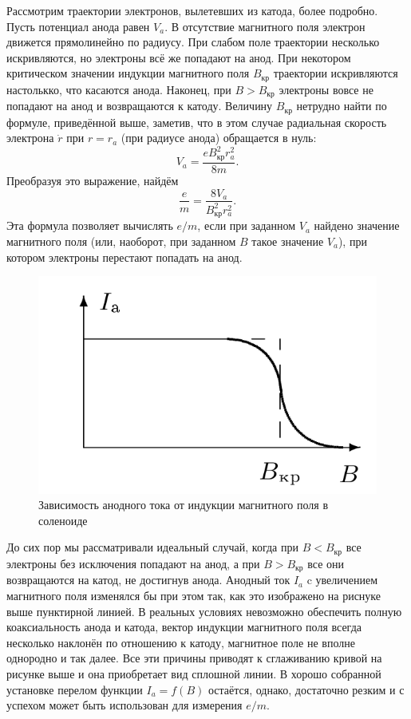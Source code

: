 \documentclass[a4paper, fontsize=14pt]{article}
\begin{document}
Рассмотрим траектории электронов, вылетевших из катода, более подробно. Пусть потенциал анода равен $V_a$. В отсутствие магнитного поля электрон движется прямолинейно по радиусу. При слабом поле траектории несколько искривляются, но электроны всё же попадают на анод. При некотором критическом значении индукции магнитного поля $B_\text{кр}$ траектории искривляются настолькко, что касаются анода. Наконец, при $B > B_\text{кр}$ электроны вовсе не попадают на анод и возвращаются к катоду. Величину $B_\text{кр}$ нетрудно найти по формуле, приведённой выше, заметив, что в этом случае радиальная скорость электрона $\dot r$ при $r = r_a$ (при радиусе анода) обращается в нуль:
\[
	V_a = \frac{e B_\text{кр}^2 r_a^2}{8 m}.
\]
Преобразуя это выражение, найдём 
\[
	\frac{e}{m} = \frac{8 V_a}{B_\text{кр}^2 r_a^2}.
\]
Эта формула позволяет вычислять $e / m$, если при заданном $V_a$ найдено значение магнитного поля (или, наоборот, при заданном $B$ такое значение $V_a$), при котором электроны перестают попадать на анод.
\begin{figure}[H]
\center
\includegraphics[scale=0.4]{tr1.png}
\caption{Зависимость анодного тока от индукции магнитного поля в соленоиде}
\end{figure}
До сих пор мы рассматривали идеальный случай, когда при $B < B_\text{кр}$ все электроны без исключения попадают на анод, а при $B > B_\text{кр}$ все они возвращаются на катод, не достигнув анода. Анодный ток $I_a$ c увеличением магнитного поля изменялся бы при этом так, как это изображено на риснуке выше пунктирной линией. В реальных условиях невозможно обеспечить полную коаксиальность анода и катода, вектор индукции магнитного поля всегда несколько наклонён по отношению к катоду, магнитное поле не вполне однородно и так далее. Все эти причины приводят к сглаживанию кривой на рисунке выше и она приобретает вид сплошной линии. В хорошо собранной установке перелом функции $I_a = f(B)$ остаётся, однако, достаточно резким и с успехом может быть использован для измерения $e / m$.
\newpage
\end{document}
